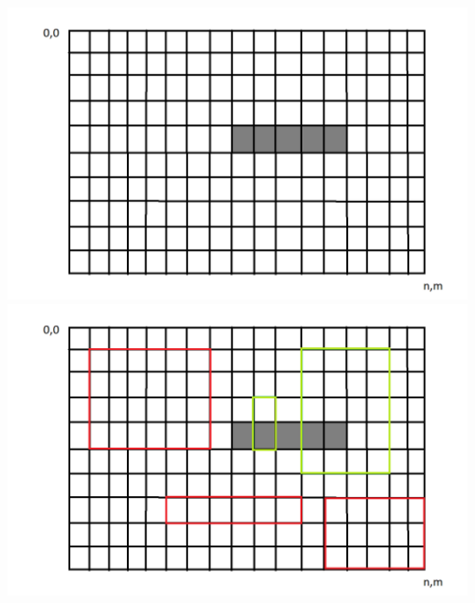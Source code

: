 \documentclass[11pt]{article}
\begin{document}
\begin{qunlist}
\includegraphics[width=\textwidth]{rod.png}
\includegraphics[width=\textwidth]{query.png}



\end{qunlist}
\end{document}

